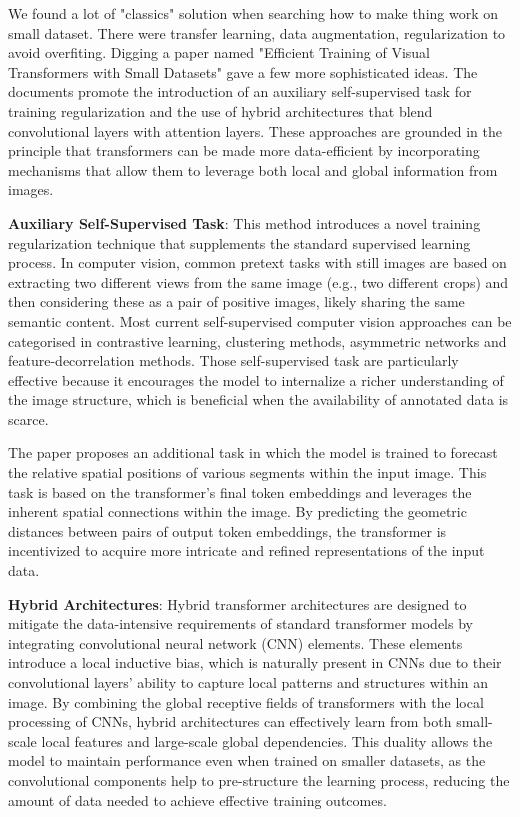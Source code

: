 We found a lot of "classics" solution when searching how to make thing work on small dataset. There were transfer learning, data augmentation, regularization to avoid overfiting. 
Digging a paper named "Efficient Training of Visual Transformers with Small Datasets" gave a few more sophisticated ideas. The documents promote the introduction of an auxiliary self-supervised task for training regularization and the use of hybrid architectures that blend convolutional layers with attention layers. These approaches are grounded in the principle that transformers can be made more data-efficient by incorporating mechanisms that allow them to leverage both local and global information from images.

\textbf{Auxiliary Self-Supervised Task}: This method introduces a novel training regularization technique that supplements the standard supervised learning process. In computer vision, common pretext tasks with still images are based on extracting two different views from the same image (e.g., two different crops) and then considering these as a pair of positive images, likely sharing the same semantic content. Most current self-supervised computer
vision approaches can be categorised in contrastive learning, clustering methods, asymmetric networks and feature-decorrelation methods. Those self-supervised task are particularly effective because it encourages the model to internalize a richer understanding of the image structure, which is beneficial when the availability of annotated data is scarce.

The paper proposes an additional task in which the model is trained to forecast the relative spatial positions of various segments within the input image. This task is based on the transformer's final token embeddings and leverages the inherent spatial connections within the image. By predicting the geometric distances between pairs of output token embeddings, the transformer is incentivized to acquire more intricate and refined representations of the input data.

\textbf{Hybrid Architectures}: Hybrid transformer architectures are designed to mitigate the data-intensive requirements of standard transformer models by integrating convolutional neural network (CNN) elements. These elements introduce a local inductive bias, which is naturally present in CNNs due to their convolutional layers' ability to capture local patterns and structures within an image. By combining the global receptive fields of transformers with the local processing of CNNs, hybrid architectures can effectively learn from both small-scale local features and large-scale global dependencies. This duality allows the model to maintain performance even when trained on smaller datasets, as the convolutional components help to pre-structure the learning process, reducing the amount of data needed to achieve effective training outcomes.

